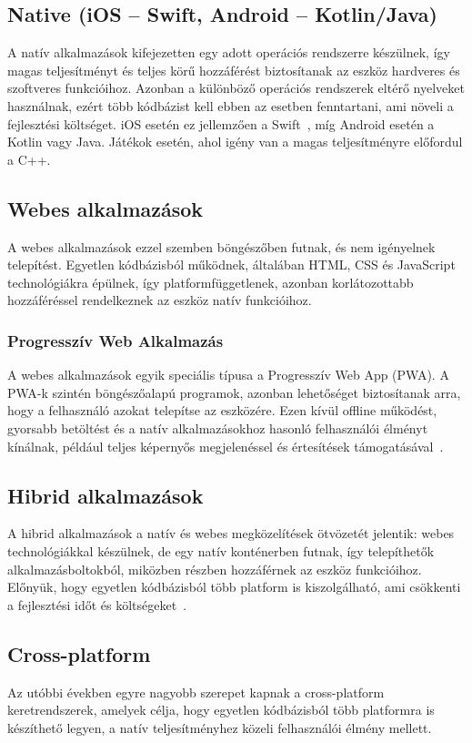 \documentclass[
]{thesis-ekf}
\theoremstyle{definition}
\theoremstyle{remark}
\begin{document}
\subsection{Native (iOS -- Swift, Android -- Kotlin/Java)}
A natív alkalmazások kifejezetten egy adott operációs rendszerre készülnek, így magas teljesítményt és teljes körű hozzáférést biztosítanak az eszköz hardveres és szoftveres funkcióihoz. Azonban a különböző operációs rendszerek eltérő nyelveket használnak, ezért több kódbázist kell ebben az esetben fenntartani, ami növeli a fejlesztési költséget. iOS esetén ez jellemzően a Swift~\cite{iOS_languages}, míg Android esetén a Kotlin vagy Java. Játékok esetén, ahol igény van a magas teljesítményre előfordul a C++\cite{android_languages}.

\subsection{Webes alkalmazások}
A webes alkalmazások ezzel szemben böngészőben futnak, és nem igényelnek telepítést. Egyetlen kódbázisból működnek, általában HTML, CSS és JavaScript technológiákra épülnek, így platformfüggetlenek, azonban korlátozottabb hozzáféréssel rendelkeznek az eszköz natív funkcióihoz.

\subsubsection{Progresszív Web Alkalmazás}
A webes alkalmazások egyik speciális típusa a Progresszív Web App (PWA). A PWA-k szintén böngészőalapú programok, azonban lehetőséget biztosítanak arra, hogy a felhasználó azokat telepítse az eszközére. Ezen kívül offline működést, gyorsabb betöltést és a natív alkalmazásokhoz hasonló felhasználói élményt kínálnak, például teljes képernyős megjelenéssel és értesítések támogatásával~\cite{microsoft_PWA}.

\subsection{Hibrid alkalmazások}
A hibrid alkalmazások a natív és webes megközelítések ötvözetét jelentik: webes technológiákkal készülnek, de egy natív konténerben futnak, így telepíthetők alkalmazásboltokból, miközben részben hozzáférnek az eszköz funkcióihoz. Előnyük, hogy egyetlen kódbázisból több platform is kiszolgálható, ami csökkenti a fejlesztési időt és költségeket~\cite{ionic, cordova}.

\subsection{Cross-platform}
Az utóbbi években egyre nagyobb szerepet kapnak a cross-platform keretrendszerek, amelyek célja, hogy egyetlen kódbázisból több platformra is készíthető legyen, a natív teljesítményhez közeli felhasználói élmény mellett.
\end{document}
